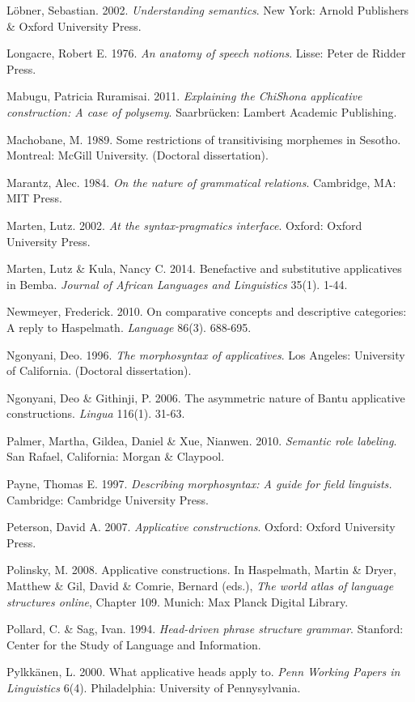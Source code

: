 Löbner, Sebastian. 2002. \textit{Understanding semantics}. New York: Arnold Publishers \& Oxford University Press.

Longacre, Robert E. 1976. \textit{An anatomy of speech notions}. Lisse: Peter de Ridder Press.

Mabugu, Patricia Ruramisai. 2011. \textit{Explaining the ChiShona applicative construction: A case of polysemy}. Saarbrücken: Lambert Academic Publishing.

Machobane, M. 1989. Some restrictions of transitivising morphemes in Sesotho. Montreal: McGill University. (Doctoral dissertation).

Marantz, Alec. 1984. \textit{On the nature of grammatical relations}. Cambridge, MA: MIT Press.

Marten, Lutz. 2002. \textit{At the syntax-pragmatics interface}. Oxford: Oxford University Press.

Marten, Lutz \& Kula, Nancy C. 2014. Benefactive and substitutive applicatives in Bemba. \textit{Journal of African Languages and Linguistics} 35(1). 1-44.

Newmeyer, Frederick.  2010. On comparative concepts and descriptive categories: A reply to Haspelmath. \textit{Language }86(3). 688-695.

Ngonyani, Deo. 1996. \textit{The morphosyntax of applicatives}. Los Angeles: University of California. (Doctoral dissertation).

Ngonyani, Deo \& Githinji, P. 2006. The asymmetric nature of Bantu applicative constructions. \textit{Lingua }116(1). 31-63.

Palmer, Martha, Gildea, Daniel \& Xue, Nianwen. 2010. \textit{Semantic role labeling}. San Rafael, California: Morgan \& Claypool.

Payne, Thomas E. 1997. \textit{Describing morphosyntax: A guide for field linguists.} Cambridge: Cambridge University Press. 

Peterson, David A.  2007. \textit{Applicative constructions}. Oxford: Oxford University Press.

Polinsky, M. 2008. Applicative constructions. In Haspelmath, Martin \& Dryer, Matthew \& Gil, David \& Comrie, Bernard (eds.), \textit{The world atlas of language structures online}, Chapter 109. Munich: Max Planck Digital Library.

Pollard, C. \& Sag, Ivan. 1994. \textit{Head-driven phrase structure grammar}. Stanford: Center for the Study of Language and Information.

Pylkkänen, L. 2000. What applicative heads apply to. \textit{Penn Working Papers in Linguistics }6(4). Philadelphia: University of Pennysylvania.

